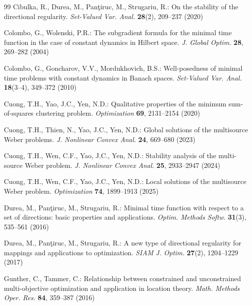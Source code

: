 \documentclass[sn-mathphys-num]{sn-jnl}%
\theoremstyle{definition}
\begin{document}
\begin{thebibliography}{99}
		Cibulka, R., Durea, M., Pan{\c{t}}iruc, M., Strugariu, R.:
		On the stability of the directional regularity.
		\textit{Set-Valued Var. Anal.} \textbf{28}(2), 209--237 (2020)
		
		Colombo, G., Wolenski, P.R.:
		The subgradient formula for the minimal time function in the case of constant dynamics in Hilbert space.
		\textit{J. Global Optim.} \textbf{28}, 269--282 (2004)
		
		
		Colombo, G., Goncharov, V.V., Mordukhovich, B.S.:
		Well-posedness of minimal time problems with constant dynamics in Banach spaces.
		\textit{Set-Valued Var. Anal.} \textbf{18}(3--4), 349--372 (2010)
		
		Cuong, T.H., Yao, J.C., Yen, N.D.:
		Qualitative properties of the minimum sum-of-squares clustering problem.
		\textit{Optimization} \textbf{69}, 2131--2154 (2020)
		
		Cuong, T.H., Thien, N., Yao, J.C., Yen, N.D.:
		Global solutions of the multisource Weber problems.
		\textit{J. Nonlinear Convex Anal.} \textbf{24}, 669--680 (2023)
		
		Cuong, T.H., Wen, C.F., Yao, J.C., Yen, N.D.:
		Stability analysis of the multi-source Weber problem.
		\textit{J. Nonlinear Convex Anal.} \textbf{25}, 2933--2947 (2024)
		
		Cuong, T.H., Wen, C.F., Yao, J.C., Yen, N.D.:
		Local solutions of the multisource Weber problem.
		\textit{Optimization} \textbf{74}, 1899--1913 (2025)
		
		
		Durea, M., Pan{\c{t}}iruc, M., Strugariu, R.:
		Minimal time function with respect to a set of directions: basic properties and applications.
		\textit{Optim. Methods Softw.} \textbf{31}(3), 535--561 (2016)
		
		Durea, M., Pan{\c{t}}iruc, M., Strugariu, R.:
		A new type of directional regularity for mappings and applications to optimization.
		\textit{SIAM J. Optim.} \textbf{27}(2), 1204--1229 (2017)
		
		Gunther, C., Tammer, C.:
		Relationship between constrained and unconstrained multi-objective optimization and application in location theory.
		\textit{Math. Methods Oper. Res.} \textbf{84}, 359--387 (2016)
		

\end{thebibliography}
\end{document}

